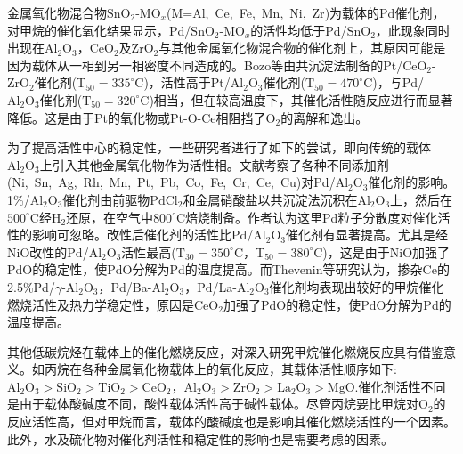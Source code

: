 金属氧化物混合物$\mathrm{SnO}_2$-$\mathrm{MO}_x$(\textrm{M=Al,~Ce,~Fe,~Mn,~Ni,~Zr})为载体的\textrm{Pd}催化剂\cite{CataD59-19_2000}，对甲烷的催化氧化结果显示，\textrm{Pd}/$\mathrm{SnO}_2$-$\mathrm{MO}_x$的活性均低于\textrm{Pd}/$\mathrm{SnO}_2$，此现象同时出现在$\mathrm{Al}_2\mathrm{O}_3$，$\mathrm{CeO}_2$及$\mathrm{ZrO}_2$与其他金属氧化物混合物的催化剂上，其原因可能是因为载体从一相到另一相密度不同造成的。\textrm{Bozo}等\cite{CataT59-33_2000}由共沉淀法制备的\textrm{Pt}/$\mathrm{CeO}_2$-$\mathrm{ZrO}_2$催化剂($\mathrm{T}_{50}=335^{\circ}\mathrm{C}$)，活性高于Pt/$\mathrm{Al}_2\mathrm{O}_3$催化剂($\mathrm{T}_{50}=470^{\circ}\mathrm{C}$)，与Pd/$\mathrm{Al}_2\mathrm{O}_3$催化剂($\mathrm{T}_{50}=320^{\circ}\mathrm{C}$)相当，但在较高温度下，其催化活性随反应进行而显著降低。这是由于\textrm{Pt}的氧化物或\textrm{Pt}-\textrm{O}-\textrm{Ce}相阻挡了$\mathrm{O}_2$的离解和逸出。

为了提高活性中心的稳定性，一些研究者进行了如下的尝试，即向传统的载体$\mathrm{Al}_2\mathrm{O}_3$上引入其他金属氧化物作为活性相。文献考察了各种不同添加剂(\textrm{Ni,~Sn,~Ag,~Rh,~Mn,~Pt,~Pb,~Co,~Fe,~Cr,~Ce,~Cu})对\textrm{Pd}/$\mathrm{Al}_2\mathrm{O}_3$催化剂的影响。1\%/$\mathrm{Al}_2\mathrm{O}_3$催化剂由前驱物$\mathrm{PdCl}_2$和金属硝酸盐以共沉淀法沉积在$\mathrm{Al}_2\mathrm{O}_3$上，然后在$500^{\circ}\mathrm{C}$经$\mathrm{H}_2$还原，在空气中$800^{\circ}\mathrm{C}$焙烧制备。作者认为这里\textrm{Pd}粒子分散度对催化活性的影响可忽略。改性后催化剂的活性比\textrm{Pd}/$\mathrm{Al}_2\mathrm{O}_3$催化剂有显著提高。尤其是经\textrm{NiO}改性的\textrm{Pd}/$\mathrm{Al}_2\mathrm{O}_3$活性最高($\mathrm{T}_{30}=350^{\circ}\mathrm{C}$，$\mathrm{T}_{50}=380^{\circ}\mathrm{C}$)，这是由于\textrm{NiO}加强了\textrm{PdO}的稳定性，使\textrm{PdO}分解为\textrm{Pd}的温度提高。而\textrm{Thevenin}\cite{JCata215-78_2003}等研究认为，掺杂\textrm{Ce}的2.5\%\textrm{Pd}/$\gamma$-$\mathrm{Al}_2\mathrm{O}_3$，\textrm{Pd}/\textrm{Ba}-$\mathrm{Al}_2\mathrm{O}_3$，\textrm{Pd}/\textrm{La}-$\mathrm{Al}_2\mathrm{O}_3$催化剂均表现出较好的甲烷催化燃烧活性及热力学稳定性，原因是$\mathrm{CeO}_2$加强了\textrm{PdO}的稳定性，使\textrm{PdO}分解为\textrm{Pd}的温度提高。

其他低碳烷烃在载体上的催化燃烧反应，对深入研究甲烷催化燃烧反应具有借鉴意义。如丙烷在各种金属氧化物载体上的氧化反应，其载体活性顺序如下:~$\mathrm{Al}_2\mathrm{O}_3>\mathrm{SiO}_2>\mathrm{TiO}_2>\mathrm{CeO}_2$，$\mathrm{Al}_2\mathrm{O}_3>\mathrm{ZrO}_2>\mathrm{La}_2\mathrm{O}_3>\mathrm{MgO}$.催化剂活性不同是由于载体酸碱度不同，酸性载体活性高于碱性载体\cite{ACA211-159_2001}。尽管丙烷要比甲烷对$\mathrm{O}_2$的反应活性高，但对甲烷而言，载体的酸碱度也是影响其催化燃烧活性的一个因素。此外，水及硫化物对催化剂活性和稳定性的影响也是需要考虑的因素。

